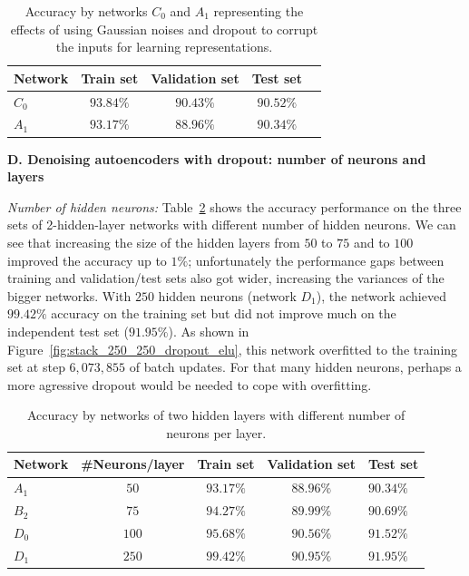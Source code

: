 \documentclass[12pt]{article}
\begin{document}
\begin{table}
\begin{center}
\begin{tabular}{|l||c|c|c|l|}
\hline
Network & Train set & Validation set & Test set\\ \hline \hline
$C_0$ & $93.84\%$ & $90.43\%$ & $90.52\%$\\ \hline
$A_1$ & $93.17\%$ & $88.96\%$ & $90.34\%$ \\ \hline
\end{tabular}
\caption{Accuracy by networks $C_0$ and $A_1$ representing the effects of using Gaussian noises and dropout to corrupt the inputs for learning representations.}
\label{tab:Accuracy_C0_vs_A1}
\end{center}
\end{table}

\vspace{5mm}
\noindent
\textbf{D. Denoising autoencoders with dropout: number of neurons and layers}

\noindent
\textit{Number of hidden neurons:} Table~\ref{tab:Accuracy_diff_num_neurons} shows the accuracy performance on the three sets of 2-hidden-layer networks with different number of hidden neurons. We can see that increasing the size of the hidden layers from $50$ to $75$ and to $100$ improved the accuracy up to $1\%$; unfortunately the performance gaps between training and validation/test sets also got wider, increasing the variances of the bigger networks. With $250$ hidden neurons (network $D_1$), the network achieved $99.42\%$ accuracy on the training set but did not improve much on the independent test set ($91.95\%$). As shown in Figure~\ref{fig:stack_250_250_dropout_elu}, this network overfitted to the training set at step $6,073,855$ of batch updates. For that many hidden neurons, perhaps a more agressive dropout would be needed to cope with overfitting.

\begin{table}
\begin{center}
\begin{tabular}{|l||c|c|c|l|}
\hline
Network & \#Neurons/layer & Train set & Validation set & Test set\\ \hline \hline
$A_1$ & $50$ & $93.17\%$ & $88.96\%$ & $90.34\%$ \\ \hline
$B_2$ & $75$ & $94.27\%$ & $89.99\%$ & $90.69\%$ \\ \hline
$D_0$ & $100$ & $95.68\%$ & $90.56\%$ & $91.52\%$ \\ \hline
$D_1$ & $250$ & $99.42\%$ & $90.95\%$ & $91.95\%$ \\ \hline
\end{tabular}
\caption{Accuracy by networks of two hidden layers with different number of neurons per layer.}
\label{tab:Accuracy_diff_num_neurons}
\end{center}
\end{table}
\end{document}

